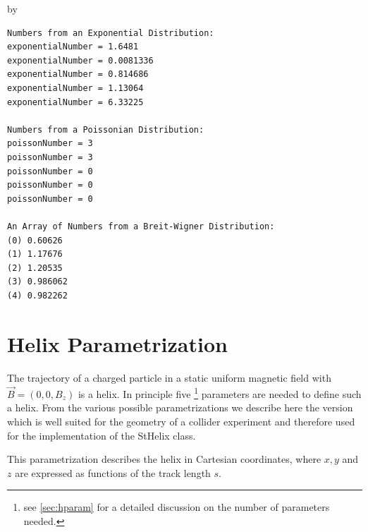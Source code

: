 \documentclass[twoside]{article}
\newcommand{\name}[1]{\textsf{#1}}%
\newcommand{\entrylabel}[1]{\mbox{\textbf{{#1}}}\hfil}%
\newenvironment{entry}
{\begin{list}{}%
    {\renewcommand{\makelabel}{\entrylabel}%
     \setlength{\labelwidth}{90pt}%
     \setlength{\leftmargin}{\labelwidth}
     \advance\leftmargin by \labelsep%
      }%
    }%
  {\end{list}}
\newcommand{\Entrylabel}[1]%
{\raisebox{0pt}[1ex][0pt]{\makebox[\labelwidth][l]%
    {\parbox[t]{\labelwidth}{\hspace{0pt}\textbf{{#1}}}}}}
\newenvironment{Entry}%
{\renewcommand{\entrylabel}{\Entrylabel}\begin{entry}}%
  {\end{entry}}
\begin{document}
\begin{Entry}
{\begin{verbatim}
Numbers from an Exponential Distribution:
exponentialNumber = 1.6481
exponentialNumber = 0.0081336
exponentialNumber = 0.814686
exponentialNumber = 1.13064
exponentialNumber = 6.33225

Numbers from a Poissonian Distribution:
poissonNumber = 3
poissonNumber = 3
poissonNumber = 0
poissonNumber = 0
poissonNumber = 0

An Array of Numbers from a Breit-Wigner Distribution:
(0) 0.60626
(1) 1.17676
(2) 1.20535
(3) 0.986062
(4) 0.982262
\end{verbatim}
} %

\end{Entry}
\clearpage

%
%

\appendix
\section{Helix Parametrization}
\label{app:helix}  
The trajectory of a charged particle in a static uniform magnetic
field with $\vec{B} = (0, 0, B_z)$ is a helix. In principle five
\footnote{see \ref{sec:hparam} for a detailed discussion on the number of parameters needed.}
parameters are needed to define such a helix. From the various
possible parametrizations we describe here the version which is well
suited for the geometry of a collider experiment and therefore used
for the implementation of the \name{StHelix} class. 

This parametrization describes the helix in Cartesian coordinates,
where $x, y$ and $z$ are expressed as functions of the track length
$s$.
\end{document}
